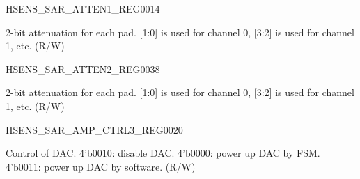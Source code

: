 \begin{register}{H}{SENS\_SAR\_ATTEN1\_REG}{\hexprefix{}0014}\label{regdesc:SENSSARATTEN1REG}
%
\regnewline%
\begin{regdesc}\begin{reglist}
\label{fielddesc:SENSSAR1ATTEN}\item [SENS\_SAR1\_ATTEN] 2-bit attenuation for each pad. [1:0] is used for channel 0, [3:2] is used for channel 1, etc. (R/W)
\end{reglist}\end{regdesc}
\end{register}


\begin{register}{H}{SENS\_SAR\_ATTEN2\_REG}{\hexprefix{}0038}\label{regdesc:SENSSARATTEN2REG}
%
\regnewline%
\begin{regdesc}\begin{reglist}
\label{fielddesc:SENSSAR2ATTEN}\item [SENS\_SAR2\_ATTEN] 2-bit attenuation for each pad. [1:0] is used for channel 0, [3:2] is used for channel 1, etc. (R/W)
\end{reglist}\end{regdesc}
\end{register}

\begin{register}{H}{SENS\_SAR\_AMP\_CTRL3\_REG}{\hexprefix{}0020}\label{regdesc:SENSSARAMPCTRL3REG}
%
%
\regnewline%
\begin{regdesc}\begin{reglist}
\label{fielddesc:SENSSAR1DACXPDFSM}\item [SENS\_SAR1\_DAC\_XPD\_FSM] Control of DAC. 4'b0010: disable DAC. 4'b0000: power up DAC by FSM. 4'b0011: power up DAC by software. (R/W)
\end{reglist}\end{regdesc}
\end{register}

